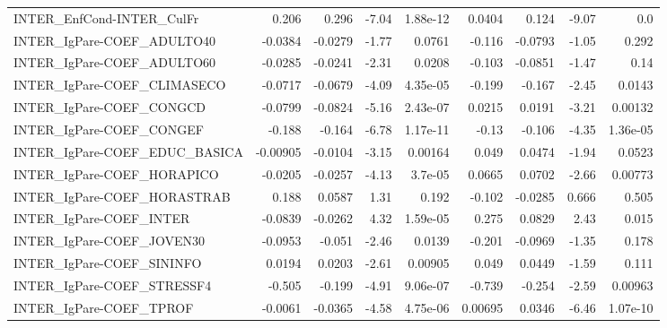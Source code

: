 \begin{tabular}{lrrrrrrrr}
INTER\_EnfCond-INTER\_CulFr             &       0.206 &        0.296 &   -7.04 & 1.88e-12 &     0.0404 &       0.124 &        -9.07 &           0.0 \\
INTER\_IgPare-COEF\_ADULTO40            &     -0.0384 &      -0.0279 &   -1.77 &   0.0761 &     -0.116 &     -0.0793 &        -1.05 &         0.292 \\
INTER\_IgPare-COEF\_ADULTO60            &     -0.0285 &      -0.0241 &   -2.31 &   0.0208 &     -0.103 &     -0.0851 &        -1.47 &          0.14 \\
INTER\_IgPare-COEF\_CLIMASECO           &     -0.0717 &      -0.0679 &   -4.09 & 4.35e-05 &     -0.199 &      -0.167 &        -2.45 &        0.0143 \\
INTER\_IgPare-COEF\_CONGCD              &     -0.0799 &      -0.0824 &   -5.16 & 2.43e-07 &     0.0215 &      0.0191 &        -3.21 &       0.00132 \\
INTER\_IgPare-COEF\_CONGEF              &      -0.188 &       -0.164 &   -6.78 & 1.17e-11 &      -0.13 &      -0.106 &        -4.35 &      1.36e-05 \\
INTER\_IgPare-COEF\_EDUC\_BASICA         &    -0.00905 &      -0.0104 &   -3.15 &  0.00164 &      0.049 &      0.0474 &        -1.94 &        0.0523 \\
INTER\_IgPare-COEF\_HORAPICO            &     -0.0205 &      -0.0257 &   -4.13 &  3.7e-05 &     0.0665 &      0.0702 &        -2.66 &       0.00773 \\
INTER\_IgPare-COEF\_HORASTRAB           &       0.188 &       0.0587 &    1.31 &    0.192 &     -0.102 &     -0.0285 &        0.666 &         0.505 \\
INTER\_IgPare-COEF\_INTER               &     -0.0839 &      -0.0262 &    4.32 & 1.59e-05 &      0.275 &      0.0829 &         2.43 &         0.015 \\
INTER\_IgPare-COEF\_JOVEN30             &     -0.0953 &       -0.051 &   -2.46 &   0.0139 &     -0.201 &     -0.0969 &        -1.35 &         0.178 \\
INTER\_IgPare-COEF\_SININFO             &      0.0194 &       0.0203 &   -2.61 &  0.00905 &      0.049 &      0.0449 &        -1.59 &         0.111 \\
INTER\_IgPare-COEF\_STRESSF4            &      -0.505 &       -0.199 &   -4.91 & 9.06e-07 &     -0.739 &      -0.254 &        -2.59 &       0.00963 \\
INTER\_IgPare-COEF\_TPROF               &     -0.0061 &      -0.0365 &   -4.58 & 4.75e-06 &    0.00695 &      0.0346 &        -6.46 &      1.07e-10 \\

\end{tabular}
